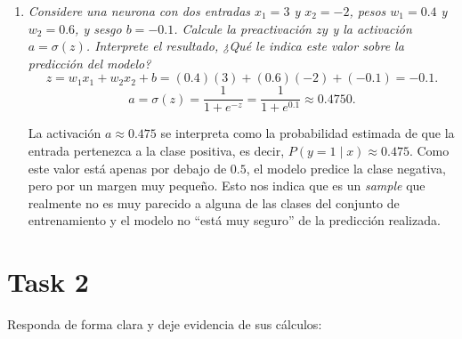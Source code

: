 \documentclass[11pt]{article}
\begin{document}
\begin{enumerate}[label=\alph*.]
  \item \textit{Considere una neurona con dos entradas $x_1 = 3$ y $x_2 = -2$, pesos $w_1 = 0.4$ y $w_2 = 0.6$, y sesgo $b = -0.1$. Calcule la
    preactivación $zy$ y la activación $a = \sigma(z)$. Interprete el resultado, ¿Qué le indica este valor sobre la predicción del modelo?}
  \[
    z = w_1 x_1 + w_2 x_2 + b = (0.4)(3) + (0.6)(-2) + (-0.1) = -0.1.
  \]
  \[
    a = \sigma(z) = \frac{1}{1 + e^{-z}} = \frac{1}{1 + e^{0.1}} \approx 0.4750.
  \]

  La activación $a \approx 0.475$ se interpreta como la probabilidad estimada de que la entrada pertenezca a la clase positiva, es decir,
  $P(y = 1 \mid x) \approx 0.475$. Como este valor está apenas por debajo de $0.5$, el modelo predice la clase negativa, pero por un
  margen muy pequeño. Esto nos indica que es un \textit{sample} que realmente no es muy parecido a alguna de las clases del conjunto de entrenamiento
  y el modelo no ``está muy seguro'' de la predicción realizada. 

\end{enumerate}

\section*{Task 2}
Responda de forma clara y deje evidencia de sus cálculos:
\end{document}
